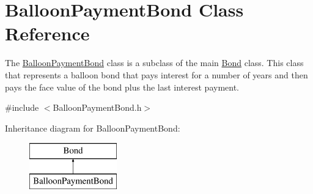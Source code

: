 \hypertarget{classBalloonPaymentBond}{}\section{Balloon\+Payment\+Bond Class Reference}
\label{classBalloonPaymentBond}


The {\ttfamily \mbox{\hyperlink{classBalloonPaymentBond}{Balloon\+Payment\+Bond}}} class is a subclass of the main {\ttfamily \mbox{\hyperlink{classBond}{Bond}}} class. This class that represents a balloon bond that pays interest for a number of years and then pays the face value of the bond plus the last interest payment.  




{\ttfamily \#include $<$Balloon\+Payment\+Bond.\+h$>$}

Inheritance diagram for Balloon\+Payment\+Bond\+:\begin{figure}[H]
\begin{center}
\leavevmode
\includegraphics[height=2.000000cm]{classBalloonPaymentBond}
\end{center}
\end{figure}
